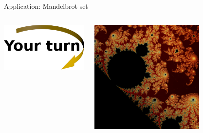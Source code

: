 \documentclass[svgnames]{beamer}
\begin{document}
\begin{frame}{Application: Mandelbrot set}
\begin{columns}
\begin{column}{0.5\textwidth}
\begin{center}
    \vspace{0.3truecm}
    \includegraphics[width=3truecm]{yourturn}
   \end{center}
  \end{column}%
  \begin{column}{0.5\textwidth}
   \begin{center}
    \includegraphics[width=0.675\textwidth]{mandelbrot_detail}

    \vspace{2.35truecm}
   \end{center}
  \end{column}
 \end{columns}
\end{frame}
\end{document}
